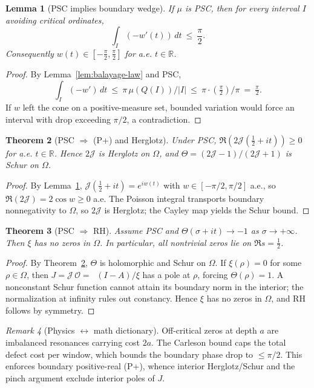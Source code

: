 \documentclass[11pt]{article}
\newtheorem{theorem}{Theorem}
\newtheorem{lemma}[theorem]{Lemma}
\theoremstyle{definition}
\theoremstyle{remark}
\newtheorem{remark}[theorem]{Remark}
\newcommand{\R}{\mathbb{R}}
\DeclareMathOperator{\dettwo}{det_2}
\begin{document}
\begin{lemma}[PSC implies boundary wedge]\label{lem:wedge-PSC}
If \(\mu\) is PSC, then for every interval \(I\) avoiding critical ordinates,
\[\int_I (-w'(t))\,dt\ \le\ \frac{\pi}{2}.\]
Consequently \(w(t)\in[-\tfrac{\pi}{2},\tfrac{\pi}{2}]\) for a.e. \(t\in\R\).
\end{lemma}
\begin{proof}
By Lemma~\ref{lem:balayage-law} and PSC,
\[\int_I (-w')\,dt\ \le\ \pi\,\mu(Q(I))/|I|\ \le\ \pi\cdot(\tfrac{\pi}{2})/\pi\ =\ \tfrac{\pi}{2}.
\]
If \(w\) left the cone on a positive-measure set, bounded variation would force an interval with drop exceeding \(\pi/2\), a contradiction.
\end{proof}
\begin{theorem}[PSC \(\Rightarrow\) (P+) and Herglotz]\label{thm:PSC-Pplus}
Under PSC, \(\Re(2\mathcal J(\tfrac12+it))\ge 0\) for a.e. \(t\in\R\). Hence \(2\mathcal J\) is Herglotz on \(\Omega\), and \(\Theta=(2\mathcal J-1)/(2\mathcal J+1)\) is Schur on \(\Omega\).
\end{theorem}
\begin{proof}
By Lemma~\ref{lem:wedge-PSC}, \(\mathcal J(\tfrac12+it)=e^{iw(t)}\) with \(w\in[-\pi/2,\pi/2]\) a.e., so \(\Re(2\mathcal J)=2\cos w\ge 0\) a.e.
The Poisson integral transports boundary nonnegativity to \(\Omega\), so \(2\mathcal J\) is Herglotz; the Cayley map yields the Schur bound.
\end{proof}

\begin{theorem}[PSC \(\Rightarrow\) RH]\label{thm:PSC-RH}
Assume PSC and \(\Theta(\sigma+it)\to -1\) as \(\sigma\to+\infty\). Then \(\xi\) has no zeros in \(\Omega\). In particular, all nontrivial zeros lie on \(\Re s=\tfrac12\).
\end{theorem}
\begin{proof}
By Theorem~\ref{thm:PSC-Pplus}, \(\Theta\) is holomorphic and Schur on \(\Omega\).
If \(\xi(\rho)=0\) for some \(\rho\in\Omega\), then \(J=\mathcal J\,\mathcal O=\dettwo(I-A)/\xi\) has a pole at \(\rho\), forcing \(\Theta(\rho)=1\). A nonconstant Schur function cannot attain its boundary norm in the interior; the normalization at infinity rules out constancy. Hence \(\xi\) has no zeros in \(\Omega\), and RH follows by symmetry.
\end{proof}

\begin{remark}[Physics $\leftrightarrow$ math dictionary]
Off-critical zeros at depth \(a\) are imbalanced resonances carrying cost \(2a\). The Carleson bound caps the total defect cost per window, which bounds the boundary phase drop to \(\le\pi/2\). This enforces boundary positive-real (P+), whence interior Herglotz/Schur and the pinch argument exclude interior poles of \(J\).
\end{remark}
\end{document}
